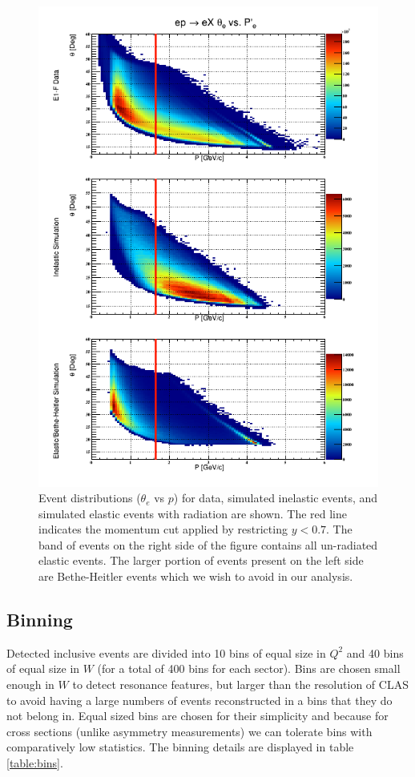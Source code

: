 \begin{figure}
	\centering
	\label{fig-kinematics-compare} 
	\includegraphics[width=\textwidth]{image/plots/inclusive/ycut.png}
	\caption{Event distributions ($\theta_e$ vs $p$) for data, simulated inelastic events, and simulated elastic events with radiation are shown.  The red line indicates the momentum cut applied by restricting $y < 0.7$.   The band of events on the right side of the figure contains all un-radiated elastic events.  The larger portion of events present on the left side are Bethe-Heitler events which we wish to avoid in our analysis.}
\end{figure}

\subsection{Binning}
Detected inclusive events are divided into 10 bins of equal size in $Q^2$ and 40 bins of equal size in $W$ (for a total of 400 bins for each sector).  Bins are chosen small enough in $W$ to detect resonance features, but larger than the resolution of CLAS to avoid having a large numbers of events reconstructed in a bins that they do not belong in.  Equal sized bins are chosen for their simplicity and because for cross sections (unlike asymmetry measurements) we can tolerate bins with comparatively low statistics.  The binning details are displayed in table \ref{table:bins}. 

